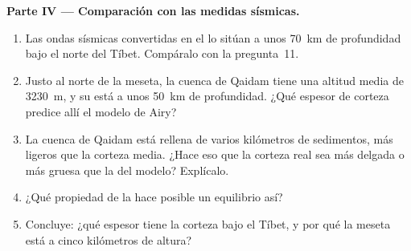 \begin{problem}
\medskip
\noindent\textbf{Parte IV --- Comparación con las medidas sísmicas.}
\begin{enumerate}[resume]
  \item Las ondas sísmicas convertidas en el  lo sitúan a unos
        \qty{70}{km} de profundidad bajo el norte del Tíbet. Compáralo con la
        pregunta~11.
  \item Justo al norte de la meseta, la cuenca de Qaidam tiene una altitud
        media de \qty{3230}{m}, y su  está a unos \qty{50}{km} de
        profundidad. ¿Qué espesor de corteza predice allí el modelo de Airy?
  \item La cuenca de Qaidam está rellena de varios kilómetros de
        sedimentos, más ligeros que la corteza media. ¿Hace eso que la
        corteza real sea más delgada o más gruesa que la del modelo?
        Explícalo.
  \item ¿Qué propiedad de la  hace posible un equilibrio así?
  \item Concluye: ¿qué espesor tiene la corteza bajo el Tíbet, y por qué la
        meseta está a cinco kilómetros de altura?
\end{enumerate}
\end{problem}
